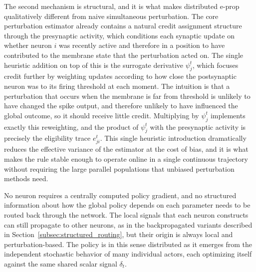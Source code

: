    The second mechanism is structural, and it is what makes distributed e-prop
    qualitatively different from naive simultaneous perturbation. The core perturbation
    estimator already contains a natural credit assignment structure through the presynaptic
    activity, which conditions each synaptic update on whether neuron $i$ was recently
    active and therefore in a position to have contributed to the membrane state that the
    perturbation acted on. The single heuristic addition on top of this is the surrogate
    derivative $\psi_j^t$, which focuses credit further by weighting updates according to
    how close the postsynaptic neuron was to its firing threshold at each moment. The
    intuition is that a perturbation that occurs when the membrane is far from
    threshold is unlikely to have changed the spike output, and therefore unlikely to have
    influenced the global outcome, so it should receive little credit. Multiplying by
    $\psi_j^t$ implements exactly this reweighting, and the product of $\psi_j^t$ with the
    presynaptic activity is precisely the eligibility trace $e_{ji}^t$. This single
    heuristic introduction dramatically reduces the effective variance of the estimator at
    the cost of bias, and it is what makes the rule stable enough to operate online in
    a single continuous trajectory without requiring the large parallel populations that
    unbiased perturbation methods need.
    
    No neuron requires a centrally computed policy gradient, and no structured information
    about how the global policy depends on each parameter needs to be routed back through
    the network. The local signals that each neuron constructs can still propagate to other
    neurons, as in the backpropagated variants described in
    Section~\ref{subsec:structured_routing}, but their origin is always local and perturbation-based. The policy is in this
    sense distributed as it emerges from the independent stochastic behavior of many
    individual actors, each optimizing itself against the same shared scalar signal
    $\delta_t$.


